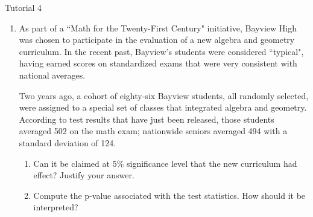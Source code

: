 \documentclass[11pt,a4paper]{article}
\newcommand{\V}[1]{``{#1}"}
\begin{document}
\begin{center}
\begin{Huge}
Tutorial 4
\end{Huge}
\end{center}


\begin{enumerate}[labelindent=0pt,labelwidth=0.75em,leftmargin=!]
\item  As part of a \V{Math for the Twenty-First Century} initiative, Bayview High  was chosen to participate in the evaluation of a new algebra and geometry curriculum. In the  recent past, Bayview's students were considered \V{typical}, having earned scores on standardized exams that were very consistent with national averages.

Two years ago, a cohort of eighty-six Bayview students, all randomly selected, were assigned to a special set of classes that integrated algebra and geometry. According to test results that have just been released, those students averaged 502 on the math exam; nationwide seniors averaged 494 with a standard deviation of 124.
\begin{enumerate}
\item Can it be claimed at $5\%$ significance level that the new curriculum had effect? Justify your answer.
\item Compute the p-value associated with the test statistics. How should it be interpreted? 
\end{enumerate}


\end{enumerate}
\end{document}
